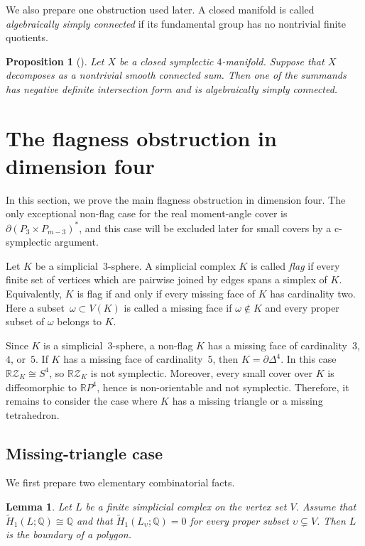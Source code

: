 \documentclass{amsart}
\newtheorem{lemma}[theorem]{Lemma}
\newtheorem{proposition}[theorem]{Proposition}
\numberwithin{equation}{section}
\theoremstyle{definition}
\theoremstyle{remark}
\newcommand{\R}{\mathbb R}
\newcommand{\Q}{\mathbb Q}
\newcommand{\RZ}{\mathbb R\mathcal Z}
\begin{document}
We also prepare one obstruction used later.
A closed manifold is called \emph{algebraically simply connected} if its fundamental group has no nontrivial finite quotients.
\begin{proposition}[{\cite[Proposition~1]{Kotschick-Morgan-Taubes1995}}] \label{prop:KMT-connected-sum}
    Let $X$ be a closed symplectic $4$-manifold.
    Suppose that $X$ decomposes as a nontrivial smooth connected sum.
    Then one of the summands has negative definite intersection form and is algebraically simply connected.
\end{proposition}


\section{The flagness obstruction in dimension four}
In this section, we prove the main flagness obstruction in dimension four.
The only exceptional non-flag case for the real moment-angle cover is $\partial(P_3\times P_{m-3})^\ast$, and this case will be excluded later for
small covers by a c-symplectic argument.

Let $K$ be a simplicial~$3$-sphere.
A simplicial complex $K$ is called \emph{flag} if every finite set of vertices which are pairwise joined by edges spans a simplex of $K$.
Equivalently, $K$ is flag if and only if every missing face of $K$ has cardinality two. 
Here a subset~$\omega\subset V(K)$ is called a missing face if $\omega\notin K$ and every proper subset of $\omega$ belongs to $K$.

Since $K$ is a simplicial~$3$-sphere, a non-flag $K$ has a missing face of cardinality~$3$, $4$, or~$5$. 
If $K$ has a missing face of cardinality~$5$, then $K=\partial\Delta^4$.
In this case $\RZ_K\cong S^4$, so $\RZ_K$ is not symplectic.
Moreover, every small cover over $K$ is diffeomorphic to $\R P^4$, hence is non-orientable and not symplectic.
Therefore, it remains to consider the case where $K$ has a missing triangle or a missing tetrahedron.


\subsection{Missing-triangle case}
We first prepare two elementary combinatorial facts.

\begin{lemma} \label{lem:boundary_of_polygon}
    Let $L$ be a finite simplicial complex on the vertex set $V$. 
    Assume that $\widetilde H_1(L;\Q)\cong \Q$ and that $\widetilde H_1(L_\upsilon;\Q)=0$ for every proper subset $\upsilon\subsetneq V$. 
    Then $L$ is the boundary of a polygon.
\end{lemma}
\end{document}
